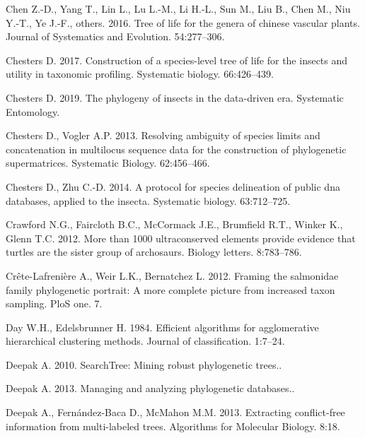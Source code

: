 \documentclass[]{article}
\begin{document}
\leavevmode\hypertarget{ref-chen2016tree}{}%
Chen Z.-D., Yang T., Lin L., Lu L.-M., Li H.-L., Sun M., Liu B., Chen M., Niu Y.-T., Ye J.-F., others. 2016. Tree of life for the genera of chinese vascular plants. Journal of Systematics and Evolution. 54:277--306.

\leavevmode\hypertarget{ref-chesters2017construction}{}%
Chesters D. 2017. Construction of a species-level tree of life for the insects and utility in taxonomic profiling. Systematic biology. 66:426--439.

\leavevmode\hypertarget{ref-chesters2019phylogeny}{}%
Chesters D. 2019. The phylogeny of insects in the data-driven era. Systematic Entomology.

\leavevmode\hypertarget{ref-chesters2013resolving}{}%
Chesters D., Vogler A.P. 2013. Resolving ambiguity of species limits and concatenation in multilocus sequence data for the construction of phylogenetic supermatrices. Systematic Biology. 62:456--466.

\leavevmode\hypertarget{ref-chesters2014protocol}{}%
Chesters D., Zhu C.-D. 2014. A protocol for species delineation of public dna databases, applied to the insecta. Systematic biology. 63:712--725.

\leavevmode\hypertarget{ref-crawford2012more}{}%
Crawford N.G., Faircloth B.C., McCormack J.E., Brumfield R.T., Winker K., Glenn T.C. 2012. More than 1000 ultraconserved elements provide evidence that turtles are the sister group of archosaurs. Biology letters. 8:783--786.

\leavevmode\hypertarget{ref-crete2012salmonidae}{}%
Crête-Lafrenière A., Weir L.K., Bernatchez L. 2012. Framing the salmonidae family phylogenetic portrait: A more complete picture from increased taxon sampling. PloS one. 7.

\leavevmode\hypertarget{ref-day1984efficient}{}%
Day W.H., Edelsbrunner H. 1984. Efficient algorithms for agglomerative hierarchical clustering methods. Journal of classification. 1:7--24.

\leavevmode\hypertarget{ref-deepak2010searchtree}{}%
Deepak A. 2010. SearchTree: Mining robust phylogenetic trees..

\leavevmode\hypertarget{ref-deepak2013managing}{}%
Deepak A. 2013. Managing and analyzing phylogenetic databases..

\leavevmode\hypertarget{ref-deepak2013extracting}{}%
Deepak A., Fernández-Baca D., McMahon M.M. 2013. Extracting conflict-free information from multi-labeled trees. Algorithms for Molecular Biology. 8:18.
\end{document}
